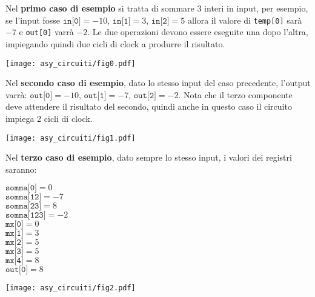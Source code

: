 \Explanation

Nel \textbf{primo caso di esempio} si tratta di sommare 3 interi in input, per esempio,
se l'input fosse $\texttt{in[0]} = -10$, $\texttt{in[1]} = 3$, $\texttt{in[2]} = 5$ allora
il valore di \texttt{temp[0]} sarà $-7$ e \texttt{out[0]} varrà $-2$. Le due operazioni devono
essere eseguite una dopo l'altra, impiegando quindi due cicli di clock a produrre il risultato.
\begin{center}
	\vspace{-5pt}
	\texttt{[image: asy\_circuiti/fig0.pdf]}
	\vspace{-5pt}
\end{center}
Nel \textbf{secondo caso di esempio}, dato lo stesso input del caso precedente, l'output
varrà: $\texttt{out[0]} = -10$, $\texttt{out[1]} = -7$, $\texttt{out[2]} = -2$. Nota che
il terzo componente deve attendere il risultato del secondo, quindi anche in questo caso
il circuito impiega 2 cicli di clock.
\begin{center}
	\vspace{-5pt}
	\texttt{[image: asy\_circuiti/fig1.pdf]}
	\vspace{-5pt}
\end{center}
Nel \textbf{terzo caso di esempio}, dato sempre lo stesso input, i valori dei registri saranno:
\begin{multicols}{3}
	$\texttt{somma[0]} = 0$ \\
	$\texttt{somma[12]} = -7$ \\
	$\texttt{somma[23]} = 8$ \\
	$\texttt{somma[123]} = -2$ \\
	$\texttt{mx[0]} = 0$ \\
	$\texttt{mx[1]} = 3$ \\
	$\texttt{mx[2]} = 5$ \\
	$\texttt{mx[3]} = 5$ \\
	$\texttt{mx[4]} = 8$ \\
	$\texttt{out[0]} = 8$ \\
\end{multicols}
\begin{center}
	\texttt{[image: asy\_circuiti/fig2.pdf]}
\end{center}
